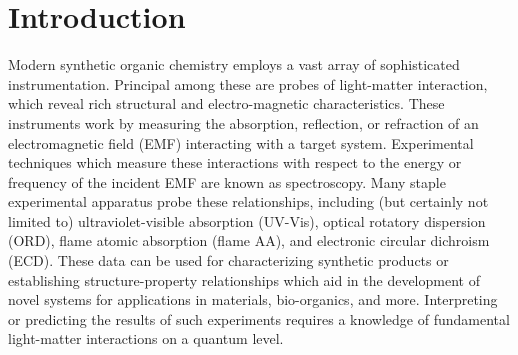 \chapter{Introduction} \label{ch:int}

Modern synthetic organic chemistry employs a vast array of sophisticated
instrumentation.  Principal among these are probes of light-matter
interaction, which reveal rich structural and electro-magnetic
characteristics. These instruments work by measuring the absorption,
reflection, or refraction of an electromagnetic field (EMF) interacting
with a target system.\cite{Barron2004} Experimental techniques which
measure these interactions with respect to the energy or frequency of
the incident EMF are known as spectroscopy. Many staple experimental
apparatus probe these relationships, including (but certainly not limited
to) ultraviolet-visible absorption (UV-Vis), optical rotatory dispersion
(ORD), flame atomic absorption (flame AA), and electronic circular dichroism
(ECD). These data can be used for characterizing synthetic products or
establishing structure-property relationships which aid in the development
of novel systems for applications in materials, bio-organics, and more.
Interpreting or predicting the results of such experiments requires a
knowledge of fundamental light-matter interactions on a quantum level.

